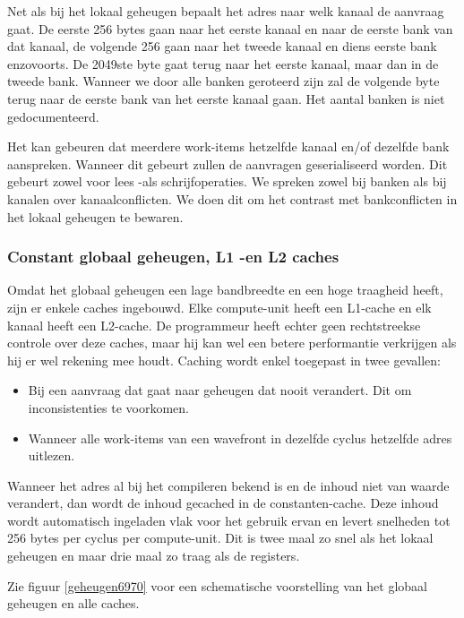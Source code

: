 Net als bij het lokaal geheugen bepaalt het adres naar welk kanaal de aanvraag gaat. De eerste 256 bytes gaan naar het eerste kanaal en naar de eerste bank van dat kanaal, de volgende 256 gaan naar het tweede kanaal en diens eerste bank enzovoorts. De 2049ste byte gaat terug naar het eerste kanaal, maar dan in de tweede bank. Wanneer we door alle banken geroteerd zijn zal de volgende byte terug naar de eerste bank van het eerste kanaal gaan. Het aantal banken is niet gedocumenteerd.

Het kan gebeuren dat meerdere work-items hetzelfde kanaal en/of dezelfde bank aanspreken. Wanneer dit gebeurt zullen de aanvragen geserialiseerd worden. Dit gebeurt zowel voor lees -als schrijfoperaties. We spreken zowel bij banken als bij kanalen over kanaalconflicten. We doen dit om het contrast met bankconflicten in het lokaal geheugen te bewaren.




\subsubsection{Constant globaal geheugen, L1 -en L2 caches}
Omdat het globaal geheugen een lage bandbreedte en een hoge traagheid heeft, zijn er enkele caches ingebouwd. Elke compute-unit heeft een L1-cache en elk kanaal heeft een L2-cache. De programmeur heeft echter geen rechtstreekse controle over deze caches, maar hij kan wel een betere performantie verkrijgen als hij er wel rekening mee houdt. Caching wordt enkel toegepast in twee gevallen:
\begin{itemize}
    \item Bij een aanvraag dat gaat naar geheugen dat nooit verandert. Dit om inconsistenties te voorkomen.
    \item Wanneer alle work-items van een wavefront in dezelfde cyclus hetzelfde adres uitlezen.
\end{itemize} 

Wanneer het adres al bij het compileren bekend is en de inhoud niet van waarde verandert, dan wordt de inhoud gecached in de constanten-cache. Deze inhoud wordt automatisch ingeladen vlak voor het gebruik ervan en levert snelheden tot 256 bytes per cyclus per compute-unit. Dit is twee maal zo snel als het lokaal geheugen en maar drie maal zo traag als de registers.

Zie figuur \ref{geheugen6970} voor een schematische voorstelling van het globaal geheugen en alle caches.

